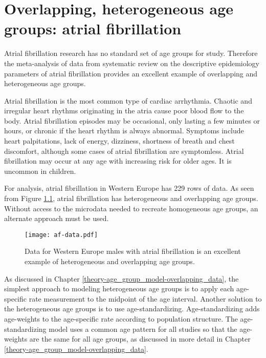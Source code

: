 \chapter{Overlapping, heterogeneous age groups: atrial fibrillation}
\label{applications-age_groups}

Atrial fibrillation research has no standard set of age groups for
study.  Therefore the meta-analysis of data from systematic review on
the descriptive epidemiology parameters of atrial fibrillation
provides an excellent example of overlapping and heterogeneous age
groups.

Atrial fibrillation is the most common type of cardiac arrhythmia.
Chaotic and irregular heart rhythms originating in the atria cause
poor blood flow to the body.  Atrial fibrillation episodes may be
occasional, only lasting a few minutes or hours, or chronic if the
heart rhythm is always abnormal.  Symptoms include heart palpitations,
lack of energy, dizziness, shortness of breath and chest discomfort,
although some cases of atrial fibrillation are symptomless.  Atrial
fibrillation may occur at any age with increasing risk for older ages.
It is uncommon in children. \cite{rich_epidemiology_2009,
  rho_asymptomoatic_2005, american_acc_2006, radford_atiral_1977}

For analysis, atrial fibrillation in Western Europe has 229 rows of
data.  As seen from Figure \ref{fig:app-af data}, atrial fibrillation
has heterogeneous and overlapping age groups.  Without access to the
microdata needed to recreate homogeneous age groups, an alternate
approach must be used.  

    \begin{figure}[h]
        \begin{center}
            \texttt{[image: af-data.pdf]}
            \caption{Data for Western Europe males with atrial
              fibrillation is an excellent example of heterogeneous
              and overlapping age groups.}
            \label{fig:app-af data}
        \end{center}
    \end{figure}

As discussed in Chapter \ref{theory-age_group_model-overlapping_data},
the simplest approach to modeling heterogeneous age groups is to apply
each age-specific rate measurement to the midpoint of the age interval.  
Another solution to the heterogeneous age groups is to use age-standardizing.
Age-standardizing adds age-weights to the age-specific rate according
to population structure.  The age-standardizing model uses a common
age pattern for all studies so that the age-weights are the same for
all age groups, as discussed in more detail in Chapter
\ref{theory-age_group_model-overlapping_data}.  

